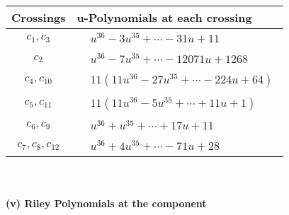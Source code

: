 \documentclass[1p]{elsarticle_modified}
\theoremstyle{definition}
\begin{document}
\begin{tabular}{m{50pt}|m{274pt}}
Crossings & \hspace{64pt}u-Polynomials at each crossing \\
\hline $$\begin{aligned}c_{1},c_{3}\end{aligned}$$&$\begin{aligned}
&u^{36}-3 u^{35}+\cdots-31 u+11
\end{aligned}$\\
\hline $$\begin{aligned}c_{2}\end{aligned}$$&$\begin{aligned}
&u^{36}-7 u^{35}+\cdots-12071 u+1268
\end{aligned}$\\
\hline $$\begin{aligned}c_{4},c_{10}\end{aligned}$$&$\begin{aligned}
&11(11 u^{36}-27 u^{35}+\cdots-224 u+64)
\end{aligned}$\\
\hline $$\begin{aligned}c_{5},c_{11}\end{aligned}$$&$\begin{aligned}
&11(11 u^{36}-5 u^{35}+\cdots+11 u+1)
\end{aligned}$\\
\hline $$\begin{aligned}c_{6},c_{9}\end{aligned}$$&$\begin{aligned}
&u^{36}+u^{35}+\cdots+17 u+11
\end{aligned}$\\
\hline $$\begin{aligned}c_{7},c_{8},c_{12}\end{aligned}$$&$\begin{aligned}
&u^{36}+4 u^{35}+\cdots-71 u+28
\end{aligned}$\\
\hline
\end{tabular}\\~\\
\newpage\renewcommand{\arraystretch}{1}
\flushleft \textbf{(v) Riley Polynomials at the component}\newline \\
\end{document}
